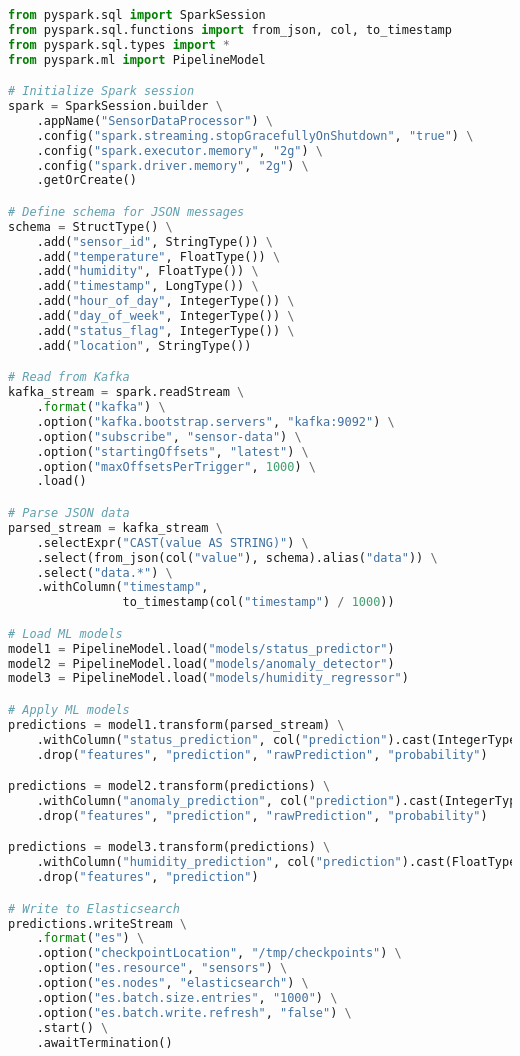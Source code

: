 \documentclass[11pt, a4paper]{article}
\newenvironment{customcode}[1]{
  \begin{tcolorbox}[
    enhanced,
    colback=codebg,
    colframe=codeframe,
    arc=0pt,
    outer arc=0pt,
    boxrule=1pt,
    left=10pt,
    right=10pt,
    top=10pt,
    bottom=10pt,
    title={#1},
    fonttitle=\sffamily\bfseries\color{mainblue},
    coltitle=white,
    colbacktitle=secondaryblue,
    attach boxed title to top left={xshift=10pt, yshift=-\tcboxedtitleheight/2},
    boxed title style={
      sharp corners,
      boxrule=0pt,
    },
  ]
}{
  \end{tcolorbox}
}
\begin{document}
\begin{customcode}{Spark Streaming Consumer (PySpark)}
\begin{lstlisting}[language=Python]
from pyspark.sql import SparkSession
from pyspark.sql.functions import from_json, col, to_timestamp
from pyspark.sql.types import *
from pyspark.ml import PipelineModel

# Initialize Spark session
spark = SparkSession.builder \
    .appName("SensorDataProcessor") \
    .config("spark.streaming.stopGracefullyOnShutdown", "true") \
    .config("spark.executor.memory", "2g") \
    .config("spark.driver.memory", "2g") \
    .getOrCreate()

# Define schema for JSON messages
schema = StructType() \
    .add("sensor_id", StringType()) \
    .add("temperature", FloatType()) \
    .add("humidity", FloatType()) \
    .add("timestamp", LongType()) \
    .add("hour_of_day", IntegerType()) \
    .add("day_of_week", IntegerType()) \
    .add("status_flag", IntegerType()) \
    .add("location", StringType())

# Read from Kafka
kafka_stream = spark.readStream \
    .format("kafka") \
    .option("kafka.bootstrap.servers", "kafka:9092") \
    .option("subscribe", "sensor-data") \
    .option("startingOffsets", "latest") \
    .option("maxOffsetsPerTrigger", 1000) \
    .load()

# Parse JSON data
parsed_stream = kafka_stream \
    .selectExpr("CAST(value AS STRING)") \
    .select(from_json(col("value"), schema).alias("data")) \
    .select("data.*") \
    .withColumn("timestamp", 
                to_timestamp(col("timestamp") / 1000))

# Load ML models
model1 = PipelineModel.load("models/status_predictor")
model2 = PipelineModel.load("models/anomaly_detector")
model3 = PipelineModel.load("models/humidity_regressor")

# Apply ML models
predictions = model1.transform(parsed_stream) \
    .withColumn("status_prediction", col("prediction").cast(IntegerType())) \
    .drop("features", "prediction", "rawPrediction", "probability")

predictions = model2.transform(predictions) \
    .withColumn("anomaly_prediction", col("prediction").cast(IntegerType())) \
    .drop("features", "prediction", "rawPrediction", "probability") 

predictions = model3.transform(predictions) \
    .withColumn("humidity_prediction", col("prediction").cast(FloatType())) \
    .drop("features", "prediction")

# Write to Elasticsearch
predictions.writeStream \
    .format("es") \
    .option("checkpointLocation", "/tmp/checkpoints") \
    .option("es.resource", "sensors") \
    .option("es.nodes", "elasticsearch") \
    .option("es.batch.size.entries", "1000") \
    .option("es.batch.write.refresh", "false") \
    .start() \
    .awaitTermination()
\end{lstlisting}
\end{customcode}
\end{document}
